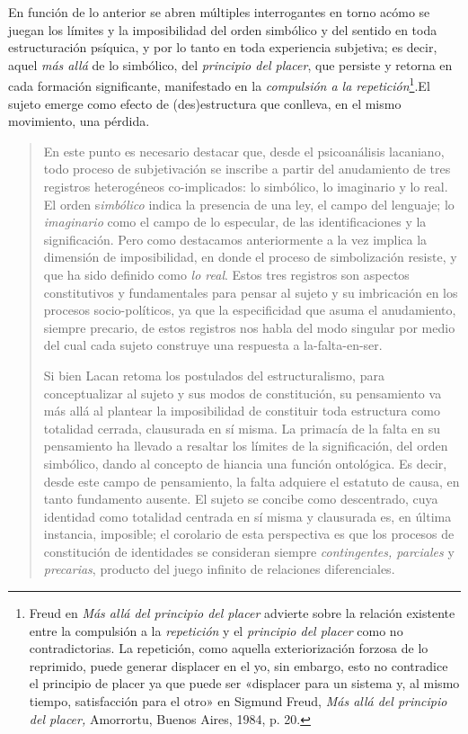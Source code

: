 En función de lo anterior se abren múltiples interrogantes en torno acómo se juegan los límites y la imposibilidad del orden simbólico y del sentido en toda estructuración psíquica, y por lo tanto en toda experiencia subjetiva; es decir, aquel \emph{más allá} de lo simbólico, del \emph{principio del placer}, que persiste y retorna en cada formación significante, manifestado en la \emph{compulsión a la repetición}\footnote{Freud en \emph{Más allá del principio del placer} advierte sobre la relación existente entre la compulsión a la \emph{repetición} y el \emph{principio del placer} como no contradictorias. La repetición, como aquella exteriorización forzosa de lo reprimido, puede generar displacer en el yo, sin embargo, esto no contradice el principio de placer ya que puede ser «displacer para un sistema y, al mismo tiempo, satisfacción para el otro» en Sigmund Freud, \emph{Más allá del principio del placer,} Amorrortu, Buenos Aires, 1984, p. 20.}.El sujeto emerge como efecto de (des)estructura que conlleva, en el mismo movimiento, una pérdida.

\begin{quote}
En este punto es necesario destacar que, desde el psicoanálisis lacaniano, todo proceso de subjetivación se inscribe a partir del anudamiento de tres registros heterogéneos co-implicados: lo simbólico, lo imaginario y lo real. El orden s\emph{imbólico} indica la presencia de una ley, el campo del lenguaje; lo \emph{imaginario} como el campo de lo especular, de las identificaciones y la significación. Pero como destacamos anteriormente a la vez implica la dimensión de imposibilidad, en donde el proceso de simbolización resiste, y que ha sido definido como \emph{lo real}. Estos tres registros son aspectos constitutivos y fundamentales para pensar al sujeto y su imbricación en los procesos socio-políticos, ya que la especificidad que asuma el anudamiento, siempre precario, de estos registros nos habla del modo singular por medio del cual cada sujeto construye una respuesta a la-falta-en-ser.

Si bien Lacan retoma los postulados del estructuralismo, para conceptualizar al sujeto y sus modos de constitución, su pensamiento va más allá al plantear la imposibilidad de constituir toda estructura como totalidad cerrada, clausurada en sí misma. La primacía de la falta en su pensamiento ha llevado a resaltar los límites de la significación, del orden simbólico, dando al concepto de hiancia una función ontológica. Es decir, desde este campo de pensamiento, la falta adquiere el estatuto de causa, en tanto fundamento ausente. El sujeto se concibe como descentrado, cuya identidad como totalidad centrada en sí misma y clausurada es, en última instancia, imposible; el corolario de esta perspectiva es que los procesos de constitución de identidades se consideran siempre \emph{contingentes, parciales} y \emph{precarias}, producto del juego infinito de relaciones diferenciales.
\end{quote}

